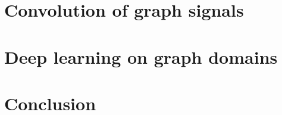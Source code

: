 \documentclass[12pt]{book}
\begin{document}
%
%

\setcounter{chapter}{1}
\chapter{Convolution of graph signals}\label{chap:2}
  \minitoc\newpage
  \newpage

\newpage
\newpage
\newpage
\newpage
\newpage

%
%
 \setcounter{chapter}{2}
 \chapter{Deep learning on graph domains}\label{chap:3}
  \minitoc\newpage
  \newpage


 \newpage
 \newpage
 \newpage
 \newpage

%
%


%
%

\chapter*{Conclusion}\label{chp:ccl}


%
%

\printbibliography[heading=bibintoc]

%
%

\end{document}
